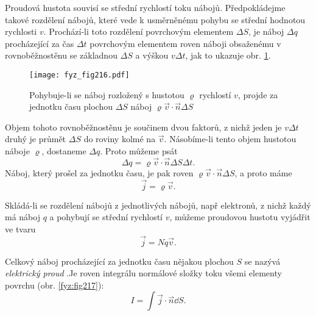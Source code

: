       Proudová hustota souvisí se střední rychlostí toku nábojů. Předpokládejme takové rozdělení 
      nábojů, které vede k usměrněnému pohybu se střední hodnotou rychlosti \(v\). Prochází-li 
      toto rozdělení povrchovým elementem \(\Delta S\), je náboj \(\Delta q\) procházející za čas 
      \(\Delta t\) povrchovým elementem roven náboji obsaženému v rovnoběžnostěnu se základnou 
      \(\Delta S\) a výškou \(v\Delta t\), jak to ukazuje obr. \ref{fyz:fig216}.
      \begin{figure}[ht!]
        \centering
        \texttt{[image: fyz\_fig216.pdf]}
        \caption{Pohybuje-li se náboj rozložený s hustotou \(\varrho\) rychlostí \(v\), projde za 
        jednotku času plochou \(\Delta S\) náboj \(\varrho\vec{v}\cdot\vec{n}\Delta S\)}
        \label{fyz:fig216} 
      \end{figure}
      
      Objem tohoto rovnoběžnostěnu je součinem dvou faktorů, z nichž jeden je \(v\Delta t\) druhý 
      je průmět \(\Delta S\) do roviny kolmé na \(\vec{v}\). Násobíme-li tento objem hustotou 
      náboje \(\varrho\), dostaneme \(\Delta q\). Proto můžeme psát
      \begin{equation}\label{eq_fyz:mag002}
        \Delta q = \varrho\vec{v}\cdot\vec{n}\Delta S\Delta t.
      \end{equation}
      Náboj, který prošel za jednotku času, je pak roven \(\varrho\vec{v}\cdot\vec{n}\Delta S\), a 
      proto máme
      \begin{equation}\label{eq_fyz:mag003}
        \vec{j} = \varrho\vec{v}.
      \end{equation}
      
      Skládá-li se rozdělení nábojů z jednotlivých nábojů, např elektronů, z nichž každý má náboj 
      \(q\) a pohybují se střední rychlostí \(v\), můžeme proudovou hustotu vyjádřit ve tvaru
      \begin{equation}\label{fyz:eq808}
        \vec{j} = Nq\vec{v}.
      \end{equation}
      
      Celkový náboj procházející za jednotku času nějakou plochou \(S\) se nazývá \emph{elektrický 
      proud} .Je roven integrálu normálové složky toku všemi elementy povrchu (obr. 
      \ref{fyz:fig217}):
      \begin{equation}\label{fyz:eq807}
        I = \int\vec{j}\cdot\vec{n}\dd{S}.
      \end{equation}
    
